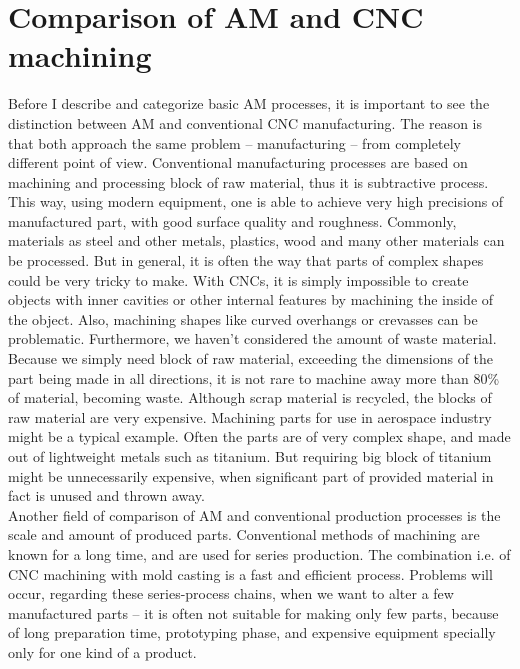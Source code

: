 \documentclass[a4paper]{report}
\begin{document}
\section{Comparison of AM and CNC machining}
%
Before I describe and categorize basic AM processes, it is important to see the distinction between AM and conventional CNC manufacturing. The reason is that both approach the same problem – manufacturing – from completely different point of view. Conventional manufacturing processes are based on machining and processing block of raw material, thus it is subtractive process. This way, using modern equipment, one is able to achieve very high precisions of manufactured part, with good surface quality and roughness. Commonly, materials as steel and other metals, plastics, wood and many other materials can be processed. But in general, it is often the way that parts of complex shapes could be very tricky to make. With CNCs, it is simply impossible to create objects with inner cavities or other internal features by machining the inside of the object. Also, machining shapes like curved overhangs or crevasses can be problematic. Furthermore, we haven’t considered the amount of waste material. Because we simply need block of raw material, exceeding the dimensions of the part being made in all directions, it is not rare to machine away more than 80\% of material, becoming waste. Although scrap material is recycled, the blocks of raw material are very expensive. Machining parts for use in aerospace industry might be a typical example. Often the parts are of very complex shape, and made out of lightweight metals such as titanium. But requiring big block of titanium might be unnecessarily expensive, when significant part of provided material in fact is unused and thrown away.\\
Another field of comparison of AM and conventional production processes is the scale and amount of produced parts. Conventional methods of machining are known for a long time, and are used for series production. The combination i.e. of CNC machining with mold casting is a fast and efficient process. Problems will occur, regarding these series-process chains, when we want to alter a few manufactured parts – it is often not suitable for making only few parts, because of long preparation time, prototyping phase, and expensive equipment specially only for one kind of a product.\\
\end{document}
